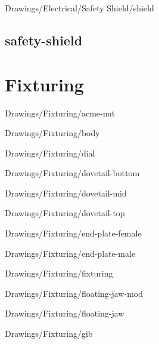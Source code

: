 
{Drawings/Electrical/Safety Shield/shield}

\subsection{safety-shield}

\section{Fixturing}


{Drawings/Fixturing/acme-nut}


{Drawings/Fixturing/body}


{Drawings/Fixturing/dial}


{Drawings/Fixturing/dovetail-bottom}


{Drawings/Fixturing/dovetail-mid}


{Drawings/Fixturing/dovetail-top}


{Drawings/Fixturing/end-plate-female}


{Drawings/Fixturing/end-plate-male}


{Drawings/Fixturing/fixturing}


{Drawings/Fixturing/floating-jaw-mod}


{Drawings/Fixturing/floating-jaw}


{Drawings/Fixturing/gib}

